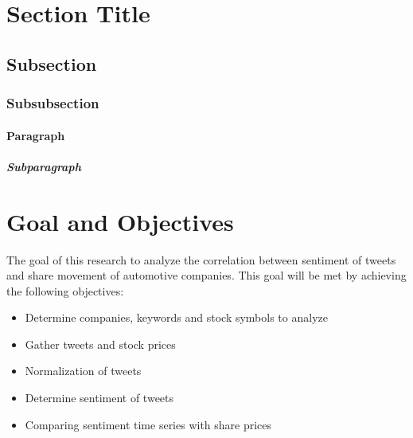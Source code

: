 \section{Section Title}

\subsection{Subsection}

\subsubsection{Subsubsection}

\paragraph{Paragraph}

\subparagraph{Subparagraph}



\section{Goal and Objectives}

The goal of this research to analyze the correlation between sentiment of tweets and share movement of automotive companies.
This goal will be met by achieving the following objectives:

\begin{itemize}
    \item Determine companies, keywords and stock symbols to analyze
    \item Gather tweets and stock prices
    \item Normalization of tweets
    \item Determine sentiment of tweets
    \item Comparing sentiment time series with share prices
\end{itemize}